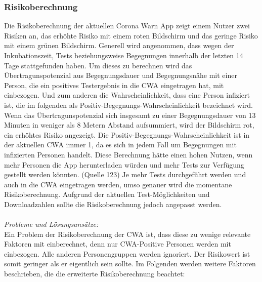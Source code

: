 \documentclass[conference]{IEEEtran}
\begin{document}
\subsubsection{Risikoberechnung}
Die Risikoberechnung der aktuellen Corona Warn App zeigt einem Nutzer zwei Risiken an, 
das erhöhte Risiko mit einem roten Bildschirm und das geringe Risiko mit einem grünen Bildschirm. 
Generell wird angenommen, dass wegen der Inkubationszeit, Tests beziehungsweise Begegnungen innerhalb der letzten 14 Tage stattgefunden haben.
Um dieses zu berechnen wird das Übertragunspotenzial aus Begegnungsdauer und Begegnungsnähe mit einer Person, 
die ein positives Testergebnis in die CWA eingetragen hat, mit einbezogen. Und zum anderen die Wahrscheinlichkeit, 
dass eine Person infiziert ist, die im folgenden als Positiv-Begegnungs-Wahrscheinlichkeit bezeichnet wird.
Wenn das Übertragunspotenzial sich insgesamt zu einer Begegnungsdauer von 13 Minuten in weniger als 8 Metern Abstand aufsummiert, 
wird der Bildschirm rot, ein erhöhtes Risiko angezeigt. Die Positiv-Begegnungs-Wahrscheinlichkeit ist in der aktuellen CWA immer 1, 
da es sich in jedem Fall um Begegnungen mit infizierten Personen handelt.
Diese Berechnung hätte einen hohen Nutzen, wenn mehr Personen die App herunterladen würden und mehr Tests zur Verfügung gestellt werden könnten. (Quelle 123)
Je mehr Tests durchgeführt werden und auch in die CWA eingetragen werden, umso genauer wird die momentane Risikoberechnung. 
Aufgrund der aktuellen Test-Möglichkeiten und Downloadzahlen sollte die Risikoberechnung jedoch angepasst werden.\\
\\
\textit{Probleme und Lösungsansätze:} \\
Ein Problem der Risikoberechnung der CWA ist, dass diese zu wenige relevante Faktoren mit einberechnet, denn nur CWA-Positive Personen werden mit einbezogen.
Alle anderen Personengruppen werden ignoriert. Der Risikowert ist somit geringer als er eigentlich sein sollte. Im Folgenden werden weitere Faktoren beschrieben, die die erweiterte Risikoberechnung beachtet:
\end{document}
